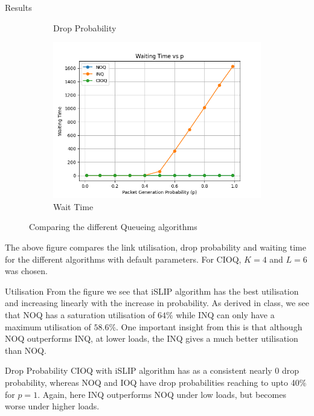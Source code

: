 \begin{section}{Results}
\begin{figure}[htbp]
\begin{subfigure}[b]{0.45\textwidth}
            \caption{Drop Probability}
            \label{fig:drop_prob}
        \end{subfigure}
        \hfill
        \begin{subfigure}[b]{0.45\textwidth}
            \centering
            \includegraphics[width=\textwidth]{figures/fig1/fig1c.png}
            \caption{Wait Time}
            \label{fig:wait_time}
        \end{subfigure}
        
        \caption{Comparing the different Queueing algorithms}
        \label{fig:combined}
    \end{figure}

    The above figure compares the link utilisation, drop probability and waiting time for the different algorithms with default parameters. For CIOQ, $K=4$ and $L=6$ was chosen. 
    \begin{subsection}{Utilisation}
        From the figure we see that iSLIP algorithm has the best utilisation and increasing linearly with the increase in probability. As derived in class, we see that NOQ has a saturation utilisation of $64\%$ while INQ can only have a maximum utilisation of $58.6\%$.
        One important insight from this is that although NOQ outperforms INQ, at lower loads, the INQ gives a much better utilisation than NOQ. 
    \end{subsection}

    \begin{subsection}{Drop Probability}
        CIOQ with iSLIP algorithm has as a consistent nearly 0 drop probability, whereas NOQ and IOQ have drop probabilities reaching to upto 40\% for $p=1$. Again, here INQ outperforms NOQ under low loads, but becomes worse under higher loads.
    \end{subsection}


\end{section}
